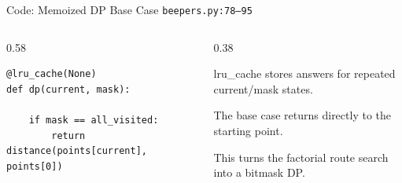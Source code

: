 \documentclass[aspectratio=169,11pt]{beamer}
\begin{document}
\begin{frame}[fragile]{Code: Memoized DP Base Case}
\scriptsize
{} \texttt{beepers.py:78--95}

\vspace{0.08cm}
\begin{columns}[T,totalwidth=\textwidth]
\begin{column}{0.58\textwidth}
\begin{lstlisting}[style=cpcode]
@lru_cache(None)
def dp(current, mask):

    if mask == all_visited:
        return distance(points[current], points[0])
\end{lstlisting}
\end{column}
\begin{column}{0.38\textwidth}
\begin{tightitemize}
  \item lru\_cache stores answers for repeated current/mask states.
  \item The base case returns directly to the starting point.
  \item This turns the factorial route search into a bitmask DP.
\end{tightitemize}
\end{column}
\end{columns}
\end{frame}
\end{document}
